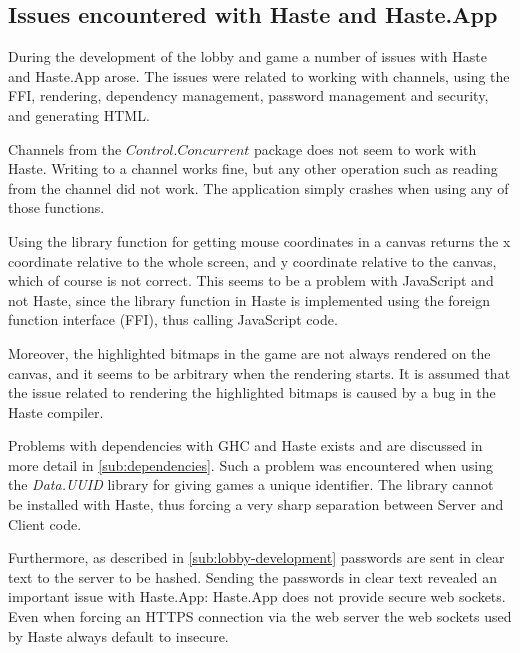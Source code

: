 \documentclass[a4paper]{article}
\begin{document}
\subsection{Issues encountered with Haste and Haste.App}
\label{sub:issues-during-development}
During the development of the lobby and game a number of issues with Haste and Haste.App arose. The issues were related to working with channels, using the FFI, rendering, dependency management, password management and security, and generating HTML. %

Channels from the $Control.Concurrent$ package does not seem to work with Haste. Writing to a channel works fine, but any other operation such as reading from the channel did not work. The application simply crashes when using any of those functions. 

Using the library function for getting mouse coordinates in a canvas returns the x coordinate relative to the whole screen, and y coordinate relative to the canvas, which of course is not correct. This seems to be a problem with JavaScript and not Haste, since the library function in Haste is implemented using the foreign function interface (FFI), thus calling JavaScript code.

Moreover, the highlighted bitmaps in the game are not always rendered on the canvas, and it seems to be arbitrary when the rendering starts. It is assumed that the issue related to rendering the highlighted bitmaps is caused by a bug in the Haste compiler.



Problems with dependencies with GHC and Haste exists and are discussed in more detail in \cref{sub:dependencies}. Such a problem was encountered when using the \textit{Data.UUID} library for giving games a unique identifier. The library cannot be installed with Haste, thus forcing a very sharp separation between Server and Client code. 

Furthermore, as described in \cref{sub:lobby-development} passwords are sent in clear text to the server to be hashed. Sending the passwords in clear text revealed an important issue with Haste.App: Haste.App does not provide secure web sockets. Even when forcing an HTTPS connection via the web server the web sockets used by Haste always default to insecure. 
\end{document}
